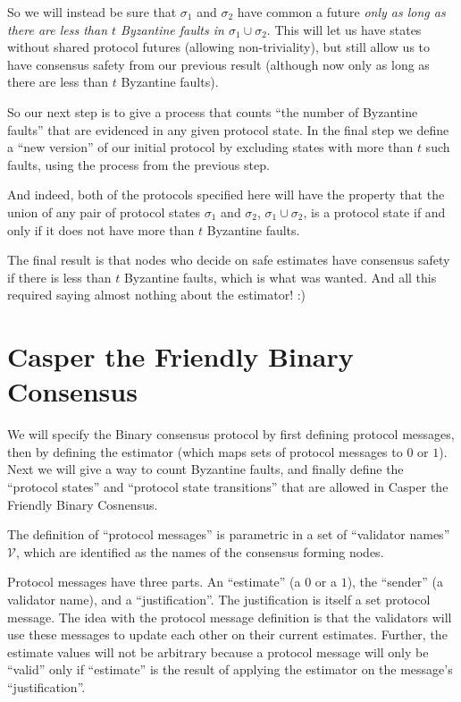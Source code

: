 \documentclass{article}
\theoremstyle{definition}
\begin{document}
So we will instead be sure that $\sigma_1$ and $\sigma_2$ have common a future \emph{only as long as there are less than $t$ Byzantine faults in $\sigma_1 \cup \sigma_2$}. This will let us have states without shared protocol futures (allowing non-triviality), but still allow us to have consensus safety from our previous result (although now only as long as there are less than $t$ Byzantine faults).

So our next step is to give a process that counts ``the number of Byzantine faults'' that are evidenced in any given protocol state. In the final step we define a ``new version'' of our initial protocol by excluding states with more than $t$ such faults, using the process from the previous step.

And indeed, both of the protocols specified here will have the property that the union of any pair of protocol states $\sigma_1$ and $\sigma_2$, $\sigma_1 \cup \sigma_2$, is a protocol state if and only if it does not have more than $t$ Byzantine faults.

The final result is that nodes who decide on safe estimates have consensus safety if there is less than $t$ Byzantine faults, which is what was wanted. And all this required saying almost nothing about the estimator! :)


\section{Casper the Friendly Binary Consensus}

We will specify the Binary consensus protocol by first defining protocol messages, then by defining the estimator (which maps sets of protocol messages to $0$ or $1$). Next we will give a way to count Byzantine faults, and finally define the ``protocol states'' and ``protocol state transitions'' that are allowed in Casper the Friendly Binary Cosnensus.

The definition of ``protocol messages'' is parametric in a set of ``validator names'' $\mathcal{V}$, which are identified as the names of the consensus forming nodes.

Protocol messages have three parts. An ``estimate'' (a $0$ or a $1$), the ``sender'' (a validator name), and a ``justification''. The justification is itself a set protocol message. The idea with the protocol message definition is that the validators will use these messages to update each other on their current estimates. Further, the estimate values will not be arbitrary because a protocol message will only be ``valid'' only if ``estimate'' is the result of applying the estimator on the message's ``justification''. 
\end{document}
